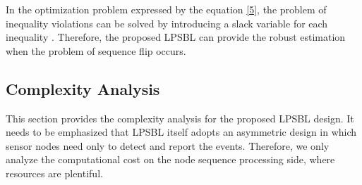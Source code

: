 In the optimization problem expressed by the equation \eqref{5}, the problem of inequality violations can be solved by introducing a slack variable for each inequality \cite{Boyd2004}.
Therefore, the proposed LPSBL can provide the robust estimation when the problem of sequence flip occurs.














\subsection{Complexity Analysis}
This section provides the complexity analysis for the proposed
LPSBL design. It needs to be emphasized that
LPSBL itself adopts an asymmetric design in which sensor
nodes need only to detect and report the events. Therefore,
we only analyze the computational cost on the node sequence
processing side, where resources are plentiful.

